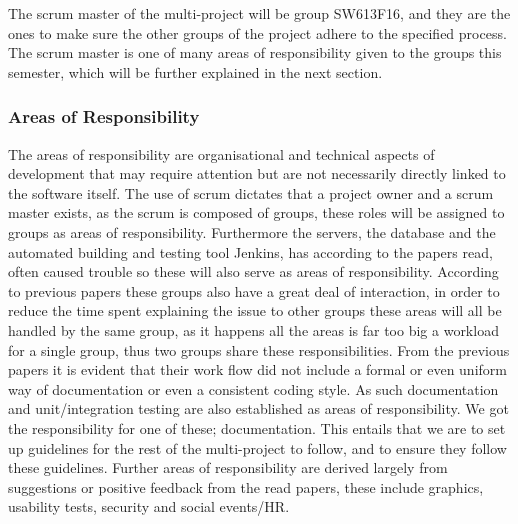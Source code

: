 The scrum master of the multi-project will be group SW613F16, and they are the ones to make sure the other groups of the project adhere to the specified process.
The scrum master is one of many areas of responsibility given to the groups this semester, which will be further explained in the next section.


\subsubsection*{Areas of Responsibility}
The areas of responsibility are organisational and technical aspects of development that may require attention but are not necessarily directly linked to the software itself.
The use of scrum dictates that a project owner and a scrum master exists, as the scrum is composed of groups, these roles will be assigned to groups as areas of responsibility.
Furthermore the servers, the database and the automated building and testing tool Jenkins, has according to the papers read, often caused trouble so these will also serve as areas of responsibility. 
According to previous papers these groups also have a great deal of interaction, in order to reduce the time spent explaining the issue to other groups these areas will all be handled by the same group, as it happens all the areas is far too big a workload for a single group, thus two groups share these responsibilities.
From the previous papers it is evident that their work flow did not include a formal or even uniform way of documentation or even a consistent coding style.
As such documentation and unit/integration testing are also established as areas of responsibility.
We got the responsibility for one of these; documentation. 
This entails that we are to set up guidelines for the rest of the multi-project to follow, and to ensure they follow these guidelines.
Further areas of responsibility are derived largely from suggestions or positive feedback from the read papers, these include graphics, usability tests, security and social events/HR.

